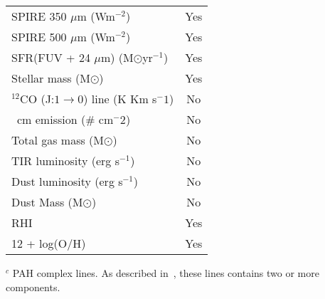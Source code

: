 \begin{table}
\begin{tabular}{ |l|c| }
SPIRE 350 $\mu$m (Wm$^{-2}$)& Yes\\
SPIRE 500 $\mu$m (Wm$^{-2}$)& Yes\\
SFR(FUV + 24 $\mu$m) (M$\odot$yr$^{-1}$) & Yes\\
Stellar mass (M$\odot$)& Yes\\
$^{12}$CO (J:$1\rightarrow0$) line (K Km s$^-1$) & No \\
\hi 21~cm emission ($\#$ cm$^-2$) & No \\
Total gas mass (M$\odot$) & No \\
TIR luminosity (erg s$^{-1}$) & No \\
Dust luminosity (erg s$^{-1}$) & No \\
Dust Mass (M$\odot$)& No\\
RHI & Yes\\
12 + log(O/H)& Yes\\
\hline
\end{tabular}
\begin{tablenotes}
\item $^c$ PAH complex lines. As described in~\cite{Smith07a}, these lines contains two or more components.
\end{tablenotes}
\end{table}